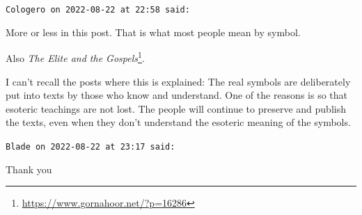 \begin{footnotesize}
\begin{sffamily}
\hfill

\texttt{Cologero on 2022-08-22 at 22:58 said:}

More or less in this post. That is what most people mean by symbol.

Also \textit{The Elite and the Gospels}\footnote{\url{https://www.gornahoor.net/?p=16286}}.

I can't recall the posts where this is explained: The real symbols are deliberately put into texts by those who know and understand. One of the reasons is so that esoteric teachings are not lost. The people will continue to preserve and publish the texts, even when they don't understand the esoteric meaning of the symbols.

\hfill

\texttt{Blade on 2022-08-22 at 23:17 said:}

Thank you


\hfill

\end{sffamily}
\end{footnotesize}

